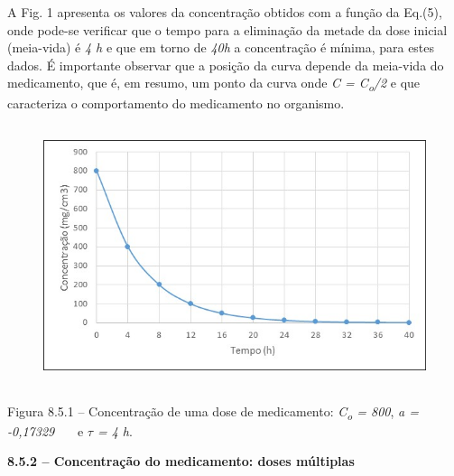 \documentclass[12pt]{article}
\begin{document}
\begin{enumerate}
\begin{justify}
A Fig. 1 apresenta os valores da concentração obtidos com a função da Eq.(5), onde pode-se verificar que o tempo para a eliminação da metade da dose inicial (meia-vida) é \textit{4 h} e que em torno de \textit{40h} a concentração é mínima, para estes dados. É importante observar que a posição da curva depende da meia-vida do medicamento, que é, em resumo, um ponto da curva onde \textit{C = C\textsubscript{o}/2} e que caracteriza o comportamento do medicamento no organismo. 
\end{justify}\par


\vspace{\baselineskip}



\begin{figure}[H]
	\begin{Center}
		\includegraphics[width=5.01in,height=3.01in]{./media/image11.jpeg}
	\end{Center}
\end{figure}



\par

Figura 8.5.1 – Concentração de uma dose de medicamento: \textit{C\textsubscript{o} = 800}, \textit{a = -0,17329} \ \ \  e \textit{$ \tau$  = 4 h}. \par


\vspace{\baselineskip}
\begin{justify}
{\fontsize{14pt}{16.8pt}\selectfont \textbf{8.5.2 – Concentração do medicamento: doses múltiplas}\par}
\end{justify}\par


\end{enumerate}
\end{document}
